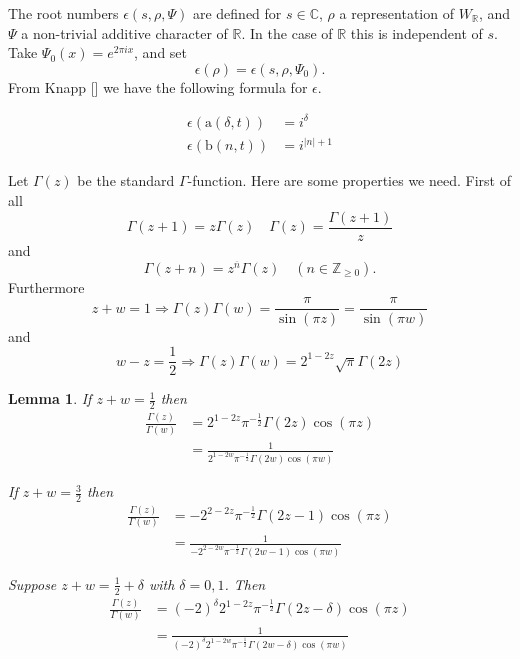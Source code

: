 \documentclass[10pt,leqno]{article}
\newtheorem{lemma}[equation]{Lemma}
\newcommand{\R}{\mathbb R}
\newcommand{\C}{\mathbb C}
\newcommand{\Z}{\mathbb Z}
\renewcommand{\b}{\mathfrak b}
\renewcommand{\a}{\mathfrak a}
\renewcommand{\a}{\mathrm a}
\renewcommand{\b}{\mathrm b}
\begin{document}
The root numbers $\epsilon(s,\rho,\Psi)$ are defined for $s\in\C$, $\rho$ a representation of $W_\R$, and $\Psi$ a non-trivial additive character of $\R$.
In the case of $\R$ this is independent of $s$. Take $\Psi_0(x)=e^{2\pi ix}$,
and set
$$
\epsilon(\rho)=\epsilon(s,\rho,\Psi_0).
$$
From Knapp [] we have the following formula for $\epsilon$.

$$
\begin{aligned}
\epsilon(\a(\delta,t))&=i^\delta\\
\epsilon(\b(n,t))&=i^{|n|+1}
\end{aligned}
$$

Let $\Gamma(z)$ be the standard $\Gamma$-function. Here are some properties we need.
First of all
$$
\Gamma(z+1)=z\Gamma(z)\quad \Gamma(z)=\frac{\Gamma(z+1)}z
$$
and
$$
\Gamma(z+n)=z^{\overline n}\Gamma(z)\quad (n\in \Z_{\ge 0}).
$$
Furthermore
\begin{equation}
\label{e:ref}
z+w=1\Rightarrow \Gamma(z)\Gamma(w)=\frac{\pi}{\sin(\pi z)}=\frac{\pi}{\sin(\pi w)}
\end{equation}
and
\begin{equation}
\label{e:dup}
w-z=\frac12\Rightarrow \Gamma(z)\Gamma(w)=2^{1-2z}\sqrt\pi \Gamma(2z)
\end{equation}


\newpage
\begin{lemma}
\label{l:Gammas}
If $z+w=\frac12$ then
$$
\begin{aligned}
  \frac{\Gamma(z)}{\Gamma(w)}&=2^{1-2z}\pi^{-\frac12}\Gamma(2z)\cos(\pi z)\\
  &=\frac1{2^{1-2w}\pi^{-\frac12}\Gamma(2w)\cos(\pi w)}
\end{aligned}  
$$


If $z+w=\frac32$ then
$$
\begin{aligned}
\frac{\Gamma(z)}{\Gamma(w)}&=-2^{2-2z}\pi^{-\frac12}\Gamma(2z-1)\cos(\pi z)\\
&=\frac1{-2^{2-2w}\pi^{-\frac12}\Gamma(2w-1)\cos(\pi w)}
\end{aligned}
$$

Suppose $z+w=\frac 12+\delta$ with $\delta=0,1$. Then
$$
\begin{aligned}
\frac{\Gamma(z)}{\Gamma(w)}&=(-2)^\delta2^{1-2z}\pi^{-\frac12}\Gamma(2z-\delta)\cos(\pi z)\\
&=\frac1{(-2)^\delta2^{1-2w}\pi^{-\frac12}\Gamma(2w-\delta)\cos(\pi w)}
\end{aligned}
$$

\end{lemma}
\end{document}
